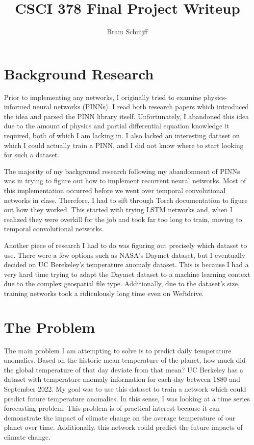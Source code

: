\documentclass[letterpaper,12pt]{article}
\title{CSCI 378 Final Project Writeup}
\author{Bram Schuijff}
\theoremstyle{plain}
\theoremstyle{definition}
\newcounter{r}
\begin{document}
\clearpage\maketitle
\thispagestyle{empty}

\section{Background Research}

Prior to implementing any networks, I originally tried to examine
physics-informed neural networks (PINNs). I read both research papers which
introduced the idea and parsed the PINN library itself. Unfortunately, I
abandoned this idea due to the amount of physics and partial differential
equation knowledge it required, both of which I am lacking in. I also lacked an
interesting dataset on which I could actually train a PINN, and I did not know
where to start looking for such a dataset.

The majority of my background research following my abandonment of PINNs was in
trying to figure out how to implement recurrent neural networks.  Most of this
implementation occurred before we went over temporal convolutional networks in
class. Therefore, I had to sift through Torch documentation to figure out how
they worked. This started with trying LSTM networks and, when I realized they
were overkill for the job and took far too long to train, moving to temporal
convolutional networks.

Another piece of research I had to do was figuring out precisely which dataset
to use. There were a few options such as NASA's Daymet dataset, but I
eventually decided on UC Berekeley's temperature anomaly dataset. This is
because I had a very hard time trying to adapt the Daymet dataset to a machine
learning context due to the complex geospatial file type. Additionally, due to
the dataset's size, training networks took a ridiculously long time even on
Weftdrive.

\section{The Problem}

The main problem I am attempting to solve is to predict daily temperature
anomalies. Based on the historic mean temperature of the planet, how much did
the global temperature of that day deviate from that mean? UC Berkeley has a
dataset with temperature anomaly information for each day between 1880 and
September 2022. My goal was to use this dataset to train a network which could
predict future temperature anomalies. In this sense, I was looking at a time
series forecasting problem. This problem is of practical interest because it
can demonstrate the impact of climate change on the average temperature of our
planet over time. Additionally, this network could predict the future impacts
of climate change.
\end{document}
